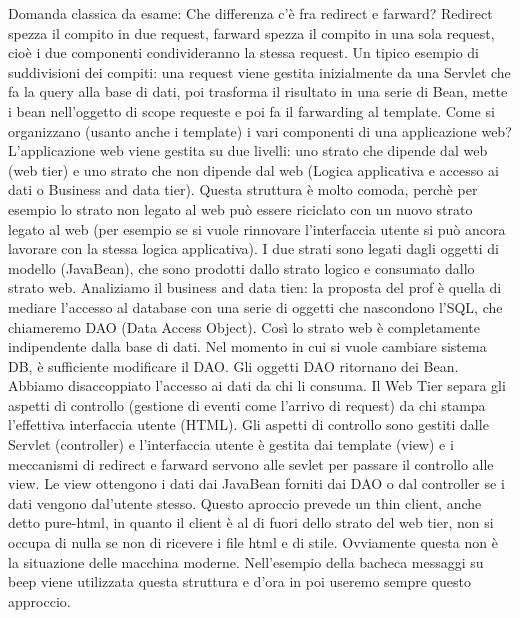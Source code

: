 Domanda classica da esame: Che differenza c'è fra redirect e farward? Redirect spezza il compito in due request, farward spezza il compito in una sola request, cioè i due componenti condivideranno la stessa request.\newline
Un tipico esempio di suddivisioni dei compiti: una request viene gestita inizialmente da una Servlet che fa la query alla base di dati, poi trasforma il risultato in una serie di Bean, mette i bean nell'oggetto di scope requeste e poi fa il farwarding al template. \newline
\newline
Come si organizzano (usanto anche i template) i vari componenti di una applicazione web?\newline
L'applicazione web viene gestita su due livelli: uno strato che dipende dal web (web tier) e uno strato che non dipende dal web (Logica applicativa e accesso ai dati o Business and data tier). \newline
Questa struttura è molto comoda, perchè per esempio lo strato non legato al web può essere riciclato con un nuovo strato legato al web (per esempio se si vuole rinnovare l'interfaccia utente si può ancora lavorare con la stessa logica applicativa).\newline
I due strati sono legati dagli oggetti di modello (JavaBean), che sono prodotti dallo strato logico e consumato dallo strato web.\newline
Analiziamo il business and data tien: la proposta del prof è quella di mediare l'accesso al database con una serie di oggetti che nascondono l'SQL, che chiameremo DAO (Data Access Object). Così lo strato web è completamente indipendente dalla base di dati. Nel momento in cui si vuole cambiare sistema DB, è sufficiente modificare il DAO. Gli oggetti DAO ritornano dei Bean. Abbiamo disaccoppiato l'accesso ai dati da chi li consuma.\newline
Il Web Tier separa gli aspetti di controllo (gestione di eventi come l'arrivo di request) da chi stampa l'effettiva interfaccia utente (HTML). Gli aspetti di controllo sono gestiti dalle Servlet (controller) e l'interfaccia utente è gestita dai template (view) e i meccanismi di redirect e farward servono alle sevlet per passare il controllo alle view. Le view ottengono i dati dai JavaBean forniti dai DAO o dal controller se i dati vengono dal'utente stesso.\newline
Questo aproccio prevede un thin client, anche detto pure-html, in quanto il client è al di fuori dello strato del web tier, non si occupa di nulla se non di ricevere i file html e di stile. Ovviamente questa non è la situazione delle macchina moderne.
\newline
Nell'esempio della bacheca messaggi su beep viene utilizzata questa struttura e d'ora in poi useremo sempre questo approccio.